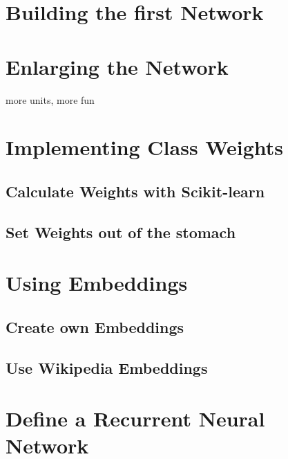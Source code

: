 \section{Building the first Network}

\section{Enlarging the Network}

more units, more fun

\section{Implementing Class Weights}

\subsection{Calculate Weights with Scikit-learn}

\subsection{Set Weights out of the stomach}

\section{Using Embeddings}

\subsection{Create own Embeddings}

\subsection{Use Wikipedia Embeddings}

\section{Define a Recurrent Neural Network}
